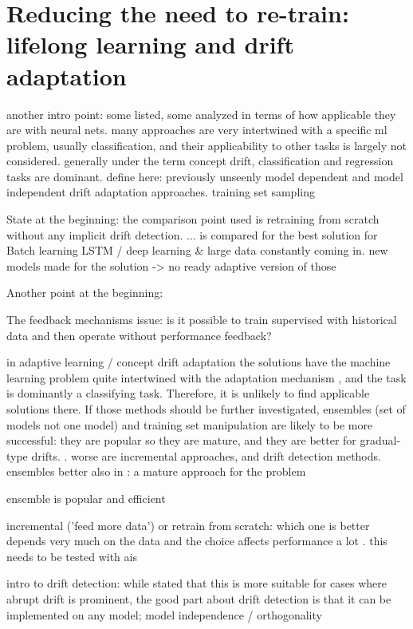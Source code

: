 \section{Reducing the need to re-train: lifelong learning and drift adaptation}

another intro point: some listed, some analyzed in terms of how applicable they are with neural nets. many approaches are very intertwined with a specific ml problem, usually classification, and their applicability to other tasks is largely not considered. generally under the term concept drift, classification and regression tasks are dominant. define here: previously unseenly model dependent and model independent drift adaptation approaches. training set sampling

State at the beginning: the comparison point used is retraining from scratch without any implicit drift detection. ... is compared for the best solution for Batch learning LSTM / deep learning
\& large data constantly coming in. new models made for the solution -> no ready adaptive version of those

Another point at the beginning: 

The feedback mechanisms issue: is it possible to train supervised with historical data and then operate without performance feedback?

in adaptive learning / concept drift adaptation the solutions have the machine learning problem quite intertwined with the adaptation mechanism \cite{celik_adaptation_2021}, and the task is dominantly a classifying task. Therefore, it is unlikely to find applicable solutions there. If those methods should be further investigated, ensembles (set of models not one model) and training set manipulation are likely to be more successful: they are popular so they are mature, and they are better for gradual-type drifts. \cite{zliobaite_driftsurvey}. worse are incremental approaches, and drift detection methods.
ensembles better also in  \cite{mlforstreamingsurvey}:
a mature approach for the problem

ensemble is popular and efficient

incremental ('feed more data') or retrain from scratch: which one is better depends very much on the data and the choice affects performance a lot \cite{celik_adaptation_2021}. this needs to be tested with ais

intro to drift detection: while \cite{zliobaite_driftsurvey} stated that this is more suitable for cases where abrupt drift is prominent, the good part about drift detection is that it can be implemented on any model; model independence / orthogonality

